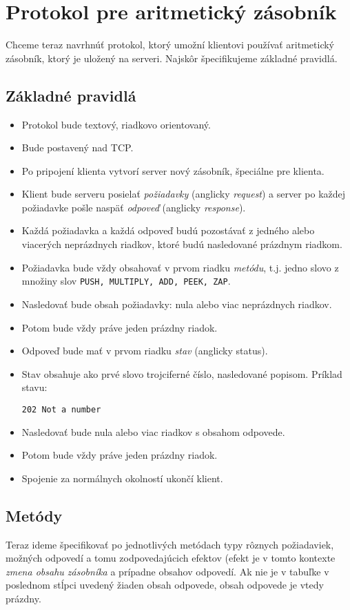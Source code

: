\documentclass[11pt]{article}
\theoremstyle{definition}
\begin{document}
\section{Protokol pre aritmetický zásobník}

Chceme teraz navrhnúť protokol, ktorý umožní klientovi používať aritmetický zásobník, ktorý je uložený na serveri.
Najskôr špecifikujeme základné pravidlá.

\subsection{Základné pravidlá}

\begin{itemize}
\item Protokol bude textový, riadkovo orientovaný.
\item Bude postavený nad TCP.
\item Po pripojení klienta vytvorí server nový zásobník, špeciálne pre klienta.
\item Klient bude serveru posielať \emph{požiadavky} (anglicky \emph{request}) a server po každej požiadavke pošle
naspäť \emph{odpoveď} (anglicky \emph{response}).
\item Každá požiadavka a každá odpoveď budú pozostávať z jedného alebo viacerých neprázdnych riadkov, ktoré budú
nasledované prázdnym riadkom.
\item Požiadavka bude vždy obsahovať v prvom riadku \emph{metódu}, t.j. jedno slovo z množiny slov 
{\tt PUSH, MULTIPLY, ADD, PEEK, ZAP}.
\item Nasledovať bude obsah požiadavky: nula alebo viac neprázdnych riadkov.
\item Potom bude vždy práve jeden prázdny riadok.
\item Odpoveď bude mať v prvom riadku \emph{stav} (anglicky status).
\item Stav obsahuje ako prvé slovo trojciferné číslo, nasledované popisom. Príklad stavu:
\begin{flushleft}
{\tt 202 Not a number}
\end{flushleft}
\item Nasledovať bude nula alebo viac riadkov s obsahom odpovede.
\item Potom bude vždy práve jeden prázdny riadok.
\item Spojenie za normálnych okolností ukončí klient.
\end{itemize}

\subsection{Metódy}
Teraz ideme špecifikovať po jednotlivých metódach typy rôznych požiadaviek, možných odpovedí a tomu
zodpovedajúcich efektov (efekt je v tomto kontexte {\em zmena obsahu zásobníka} a prípadne obsahov odpovedí.
Ak nie je v tabuľke v poslednom stĺpci uvedený žiaden obsah odpovede, obsah odpovede
je vtedy prázdny.
\end{document}
